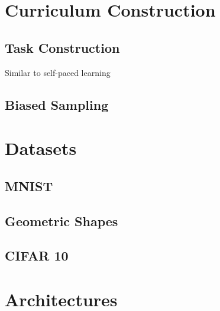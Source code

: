 \section{Curriculum Construction}

\subsection{Task Construction}
Similar to self-paced learning

\subsection{Biased Sampling}

\section{Datasets}

\subsection{MNIST}

\subsection{Geometric Shapes}

\subsection{CIFAR 10}

\section{Architectures}